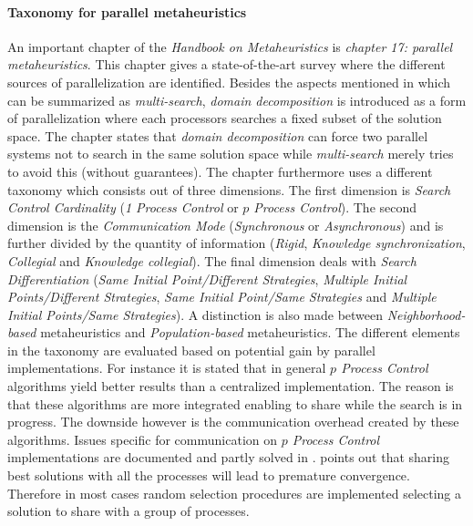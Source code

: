 \documentclass{IEEEconf}
\begin{document}
\paragraph{Taxonomy for parallel metaheuristics}
An important chapter of the \emph{Handbook on Metaheuristics}\cite{gendreau2010handbook} is \emph{chapter 17: parallel metaheuristics}\cite{craig}. This chapter gives a state-of-the-art survey where the different sources of parallelization are identified. Besides the aspects mentioned in \cite{verhoeven1996parallel} which can be summarized as \emph{multi-search}, \emph{domain decomposition} is introduced as a form of parallelization where each processors searches a fixed subset of the solution space. The chapter states that \emph{domain decomposition} can force two parallel systems not to search in the same solution space while \emph{multi-search} merely tries to avoid this (without guarantees). The chapter furthermore uses a different taxonomy which consists out of three dimensions. The first dimension is \emph{Search Control Cardinality} (\emph{1 Process Control} or \emph{$p$ Process Control}). The second dimension is the \emph{Communication Mode} (\emph{Synchronous} or \emph{Asynchronous}) and is further divided by the quantity of information (\emph{Rigid}, \emph{Knowledge synchronization}, \emph{Collegial} and \emph{Knowledge collegial}). The final dimension deals with \emph{Search Differentiation} (\emph{Same Initial Point/Different Strategies}, \emph{Multiple Initial Points/Different Strategies}, \emph{Same Initial Point/Same Strategies} and \emph{Multiple Initial Points/Same Strategies}). A distinction is also made between \emph{Neighborhood-based} metaheuristics and \emph{Population-based} metaheuristics. The different elements in the taxonomy are evaluated based on potential gain by parallel implementations. For instance it is stated that in general \emph{$p$ Process Control} algorithms yield better results than a centralized implementation. The reason is that these algorithms are more integrated enabling to share while the search is in progress. The downside however is the communication overhead created by these algorithms. Issues specific for communication on \emph{$p$ Process Control} implementations are documented and partly solved in \cite{Toulouse95communicationissues}. \cite{gendreau2010handbook} points out that sharing best solutions with all the processes will lead to premature convergence. Therefore in most cases random selection procedures are implemented selecting a solution to share with a group of processes.
\end{document}
